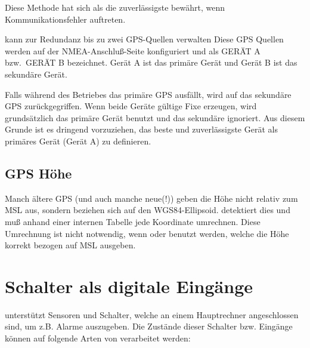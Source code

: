 Diese Methode hat sich als die zuverlässigste bewährt, wenn Kommunikationsfehler auftreten.

\xc kann zur Redundanz bis zu zwei GPS-Quellen verwalten
Diese GPS Quellen werden auf der NMEA-Anschluß-Seite konfiguriert und als GERÄT A bzw.\ GERÄT B
bezeichnet.  Gerät  A ist das primäre Gerät und Gerät B ist das sekundäre Gerät.


Falls während des Betriebes das primäre GPS ausfällt, wird auf das sekundäre GPS zurückgegriffen. Wenn beide Geräte gültige Fixe erzeugen, wird grundsätzlich das primäre Gerät benutzt und das sekundäre ignoriert.  Aus diesem Grunde ist es dringend vorzuziehen, das beste und zuverlässigste Gerät als primäres Gerät (Gerät A) zu definieren.

\subsection*{GPS Höhe}

Manch ältere GPS  (und auch manche neue(!)) geben die Höhe nicht relativ zum MSL aus, sondern beziehen sich auf den WGS84-Ellipsoid.  \xc detektiert dies und muß anhand einer internen Tabelle jede Koordinate umrechnen. Diese Umrechnung ist nicht notwendig, wenn \fl oder \al benutzt werden, welche die Höhe korrekt bezogen auf MSL ausgeben.
\section{Schalter als digitale Eingänge}

\xc unterstützt Sensoren und Schalter, welche an einem Hauptrechner angeschlossen sind, um z.B. Alarme auszugeben. Die Zustände dieser Schalter bzw. Eingänge können auf folgende Arten von \xc verarbeitet werden:

